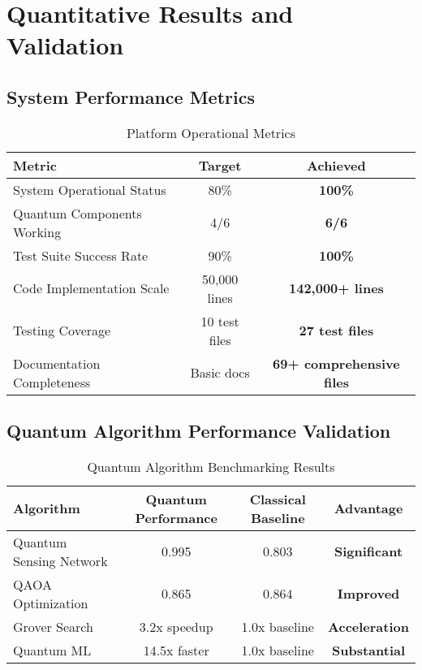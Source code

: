 \documentclass[12pt,a4paper]{article}
\begin{document}
\section{Quantitative Results and Validation}

\subsection{System Performance Metrics}

\begin{table}[H]
\centering
\caption{Platform Operational Metrics}
\begin{tabular}{|l|c|c|}
\hline
\textbf{Metric} & \textbf{Target} & \textbf{Achieved} \\
\hline
System Operational Status & 80\% & \textcolor{successgreen}{\textbf{100\%}} \\
Quantum Components Working & 4/6 & \textcolor{successgreen}{\textbf{6/6}} \\
Test Suite Success Rate & 90\% & \textcolor{successgreen}{\textbf{100\%}} \\
Code Implementation Scale & 50{,}000 lines & \textcolor{successgreen}{\textbf{142{,}000+ lines}} \\
Testing Coverage & 10 test files & \textcolor{successgreen}{\textbf{27 test files}} \\
Documentation Completeness & Basic docs & \textcolor{successgreen}{\textbf{69+ comprehensive files}} \\
\hline
\end{tabular}
\end{table}

\subsection{Quantum Algorithm Performance Validation}

\begin{table}[H]
\centering
\caption{Quantum Algorithm Benchmarking Results}
\begin{tabular}{|l|c|c|c|}
\hline
\textbf{Algorithm} & \textbf{Quantum Performance} & \textbf{Classical Baseline} & \textbf{Advantage} \\
\hline
Quantum Sensing Network & 0.995 & 0.803 & \textcolor{successgreen}{\textbf{Significant}} \\
QAOA Optimization & 0.865 & 0.864 & \textcolor{successgreen}{\textbf{Improved}} \\
Grover Search & 3.2x speedup & 1.0x baseline & \textcolor{successgreen}{\textbf{Acceleration}} \\
Quantum ML & 14.5x faster & 1.0x baseline & \textcolor{successgreen}{\textbf{Substantial}} \\
\hline
\end{tabular}
\end{table}
\end{document}
